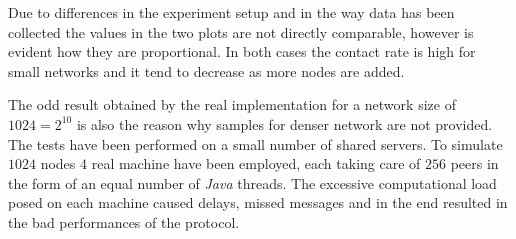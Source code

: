 Due to differences in the experiment setup and in the way data has been
collected the values in the two plots are not directly comparable,
however is evident how they are proportional. In both cases the \cloud
contact rate is high for small networks and it tend to decrease as
more nodes are added.

The odd result obtained by the real implementation for a network size
of $1024 = 2^{10}$ is also the reason why samples for
denser network are not provided. The tests have been performed on a
small number of shared servers. To simulate $1024$ nodes $4$ real
machine have been employed, each
taking care of $256$ peers in the form of an equal number of
\emph{Java} threads. The excessive computational load posed on each
machine caused delays, missed messages and in the end resulted in the
bad performances of the protocol.

